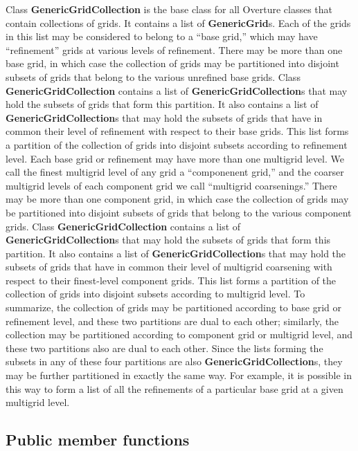 \documentclass{article}
\begin{document}
Class \textbf{GenericGridCollection} is the base class for all Overture classes that contain collections of grids.
It contains a list of \textbf{GenericGrid}s.  Each of the grids in this list may be considered to belong to a ``base grid,''
which may have ``refinement'' grids at various levels of refinement.  There may be more than one base grid, in which case the
collection of grids may be partitioned into disjoint subsets of grids that belong to the various unrefined base grids.
Class \textbf{GenericGridCollection} contains a list of \textbf{GenericGridCollection}s that may hold
the subsets of grids that form this partition.  It also contains a list of \textbf{GenericGridCollection}s that may hold
the subsets of grids that have in common their level of refinement with respect to their base grids.  This list forms a partition
of the collection of grids into disjoint subsets according to refinement level.  Each base grid or refinement may have more than
one multigrid level.  We call the finest multigrid level of any grid a ``componenent grid,'' and the coarser multigrid levels of
each component grid we call ``multigrid coarsenings.'' There may be more than one component grid, in which case the
collection of grids may be partitioned into disjoint subsets of grids that belong to the various component grids.
Class \textbf{GenericGridCollection} contains a list of \textbf{GenericGridCollection}s that may hold
the subsets of grids that form this partition.  It also contains a list of \textbf{GenericGridCollection}s that may hold
the subsets of grids that have in common their level of multigrid coarsening with respect to their finest-level component grids.
This list forms a partition of the collection of grids into disjoint subsets according to multigrid level.
To summarize, the collection of grids may be partitioned according to base grid or refinement level, and these two partitions
are dual to each other; similarly, the collection may be partitioned according to component grid or multigrid level, and these
two partitions also are dual to each other.  Since the lists forming the subsets in any of these four partitions are also
\textbf{GenericGridCollection}s, they may be further partitioned in exactly the same way.  For example, it is possible in
this way to form a list of all the refinements of a particular base grid at a given multigrid level.

\subsection{Public member functions}
\label{GenericGridCollection::PublicMemberFunctions}
\end{document}
